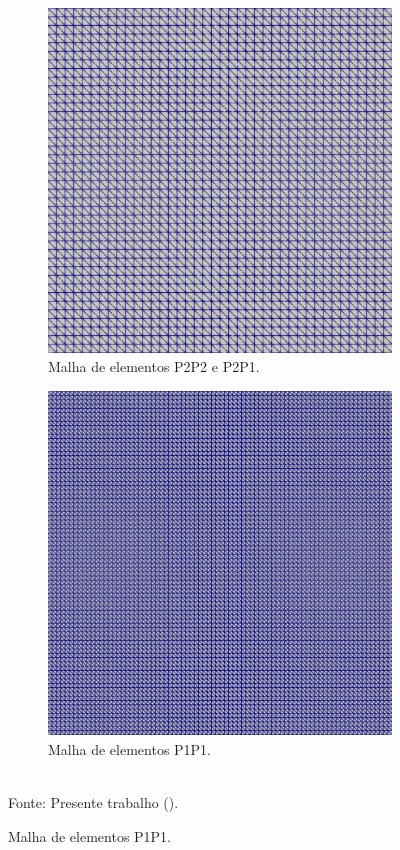 \begin{figure}[h!]
    \centering
    \caption{Cavidade bidimensional - Malhas utilizadas.}
    \begin{subfigure}{0.49\textwidth}
        \centering
        \includegraphics[width=.8\linewidth]{Figuras/Cavity/m1.png}
        \caption{Malha de elementos P2P2 e P2P1.}
    \end{subfigure}
    \begin{subfigure}{0.49\textwidth}
        \centering
        \includegraphics[width=.8\linewidth]{Figuras/Cavity/m1-Lin.png}
        \caption{Malha de elementos P1P1.}
    \end{subfigure}
    \\Fonte: Presente trabalho (\the\year).
    \label{fig:cavity-mesh}
\end{figure}

